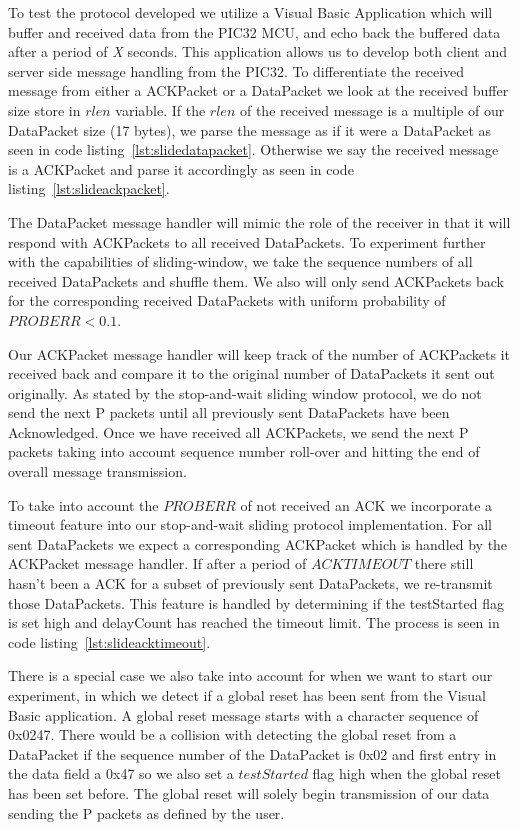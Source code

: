 \documentclass[12pt]{article}
\begin{document}
To test the protocol developed we utilize a Visual Basic Application which
will buffer and received data from the PIC32 MCU, and echo back the buffered
data after a period of \textit{X} seconds. This application allows us to develop
both client and server side message handling from the PIC32. 
To differentiate the received message from either a ACKPacket or a DataPacket 
we look at the received buffer size store in $rlen$ variable.
If the $rlen$ of the received message is a multiple of our DataPacket size
(17 bytes), we parse the message as if it were a DataPacket as seen
in code listing~\ref{lst:slidedatapacket}. Otherwise we say the received
message is a ACKPacket and parse it accordingly as seen in code 
listing~\ref{lst:slideackpacket}. 

The DataPacket message handler will mimic the role of the receiver in that
it will respond with ACKPackets to all received DataPackets. To experiment
further with the capabilities of sliding-window, we take the sequence
numbers of all received DataPackets and shuffle them. We also
will only send ACKPackets back for the corresponding received DataPackets 
with uniform probability of $PROBERR<0.1$. 

Our ACKPacket message handler will keep track of the number of ACKPackets
it received back and compare it to the original number of DataPackets it 
sent out originally. As stated by the stop-and-wait sliding window protocol,
we do not send the next P packets until all previously sent DataPackets have
been Acknowledged. Once we have received all ACKPackets, we send the next
P packets taking into account sequence number roll-over and hitting the
end of overall message transmission. 

To take into account the $PROBERR$ of not received an ACK we incorporate
a timeout feature into our stop-and-wait sliding protocol implementation. 
For all sent DataPackets we expect a corresponding ACKPacket which is 
handled by the ACKPacket message handler. If after a period of $ACKTIMEOUT$
there still hasn't been a ACK for a subset of previously sent DataPackets,
we re-transmit those DataPackets. This feature is handled by determining if
the testStarted flag is set high and delayCount has reached the timeout limit.
The process is seen in code listing~\ref{lst:slideacktimeout}.

There is a special case we also take into account for when we want to start 
our experiment, in which we detect if a global reset has been sent from the
Visual Basic application. A global reset message starts with a character
sequence of 0x0247. There would be a collision with detecting the global reset
from a DataPacket if the sequence number of the DataPacket is 0x02 and
first entry in the data field a 0x47 so we also set a $testStarted$ flag
high when the global reset has been set before. The global reset will solely
begin transmission of our data sending the P packets as defined by the user. 
\end{document}
